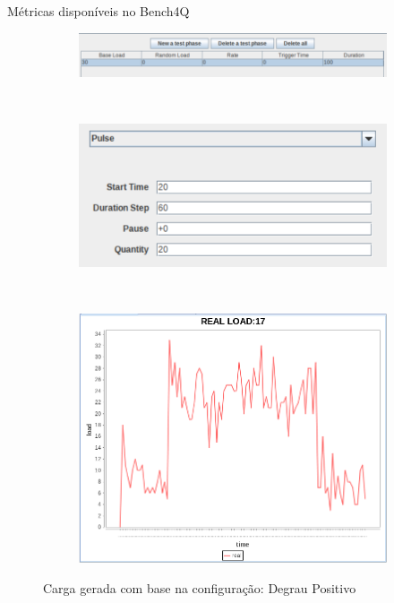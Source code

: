 \begin{frame}{Métricas disponíveis no Bench4Q}
	\begin{figure}[!htb]
		\begin{subfigure}{\linewidth}
			\centering
			\includegraphics[scale=0.7]{../monograph/images/condiguracao-carga-bench4q1.png}
			\label{fig:condiguracao-carga-bench4q1}
		\end{subfigure}\\
		\begin{subfigure}{\linewidth}
			\centering
			\includegraphics[scale=0.7]{../monograph/images/condiguracao-carga-modulada1.png}
			\label{fig:condiguracao-carga-modulada1}
		\end{subfigure}\\[1ex]
		\begin{subfigure}{\linewidth}
			\centering
			\includegraphics[scale=0.6]{../monograph/images/grafico-carga-modulada1.png}
			\label{fig:grafico-carga-modulada1}
		\end{subfigure}
		\caption{Carga gerada com base na configuração: Degrau Positivo}
		\label{fig:carga-modulada1}
	\end{figure}
\end{frame}

